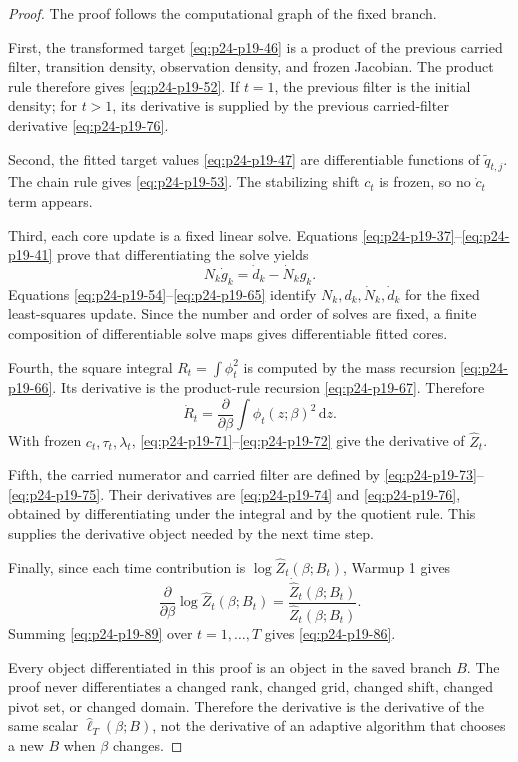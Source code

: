 \documentclass[11pt]{article}
\numberwithin{equation}{section}
\newcommand{\dd}{\,\mathrm d}
\newcommand{\widehatell}{\widehat\ell}
\begin{document}
\begin{proof}
The proof follows the computational graph of the fixed branch.

First, the transformed target \eqref{eq:p24-p19-46} is a product of the previous carried filter,
transition density, observation density, and frozen Jacobian.  The product rule
therefore gives \eqref{eq:p24-p19-52}.  If \(t=1\), the previous filter is the initial density;
for \(t>1\), its derivative is supplied by the previous carried-filter
derivative \eqref{eq:p24-p19-76}.

Second, the fitted target values \eqref{eq:p24-p19-47} are differentiable functions of
\(\widetilde q_{t,j}\).  The chain rule gives \eqref{eq:p24-p19-53}.  The stabilizing shift
\(c_t\) is frozen, so no \(\dot c_t\) term appears.

Third, each core update is a fixed linear solve.  Equations \eqref{eq:p24-p19-37}--\eqref{eq:p24-p19-41} prove
that differentiating the solve yields
\begin{equation}
    N_k\dot g_k=\dot d_k-\dot N_k g_k.
    \label{eq:p24-p19-87}
\end{equation}
Equations \eqref{eq:p24-p19-54}--\eqref{eq:p24-p19-65} identify \(N_k,d_k,\dot N_k,\dot d_k\) for the fixed
least-squares update.  Since the number and order of solves are fixed, a finite
composition of differentiable solve maps gives differentiable fitted cores.

Fourth, the square integral \(R_t=\int\phi_t^2\) is computed by the mass
recursion \eqref{eq:p24-p19-66}.  Its derivative is the product-rule recursion \eqref{eq:p24-p19-67}.  Therefore
\begin{equation}
    \dot R_t=\frac{\partial}{\partial\beta}
    \int\phi_t(z;\beta)^2\dd z.
    \label{eq:p24-p19-88}
\end{equation}
With frozen \(c_t,\tau_t,\lambda_t\), \eqref{eq:p24-p19-71}--\eqref{eq:p24-p19-72} give the derivative of
\(\widehat Z_t\).

Fifth, the carried numerator and carried filter are defined by \eqref{eq:p24-p19-73}--\eqref{eq:p24-p19-75}.
Their derivatives are \eqref{eq:p24-p19-74} and \eqref{eq:p24-p19-76}, obtained by differentiating under the
integral and by the quotient rule.  This supplies the derivative object needed
by the next time step.

Finally, since each time contribution is \(\log\widehat Z_t(\beta;B_t)\),
Warmup 1 gives
\begin{equation}
    \frac{\partial}{\partial\beta}
    \log\widehat Z_t(\beta;B_t)
    =
    \frac{\dot{\widehat Z}_t(\beta;B_t)}
    {\widehat Z_t(\beta;B_t)}.
    \label{eq:p24-p19-89}
\end{equation}
Summing \eqref{eq:p24-p19-89} over \(t=1,\ldots,T\) gives \eqref{eq:p24-p19-86}.

Every object differentiated in this proof is an object in the saved branch
\(B\).  The proof never differentiates a changed rank, changed grid, changed
shift, changed pivot set, or changed domain.  Therefore the derivative is the
derivative of the same scalar \(\widehatell_T(\beta;B)\), not the derivative of
an adaptive algorithm that chooses a new \(B\) when \(\beta\) changes.
\end{proof}
\end{document}

